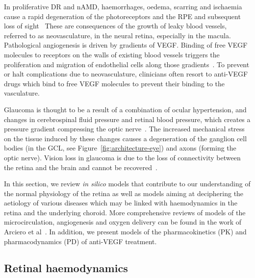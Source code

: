 \documentclass{article}
\begin{document}
In proliferative DR and nAMD, haemorrhages, oedema, scarring and ischaemia cause a rapid degeneration of the photoreceptors and the RPE and subsequent loss of sight~\cite{Gupta_2015,Jager_2008,Roberts_2020, Waldstein_2016}
These are consequences of the growth of leaky blood vessels, referred to as neovasculature, in the neural retina, especially in the macula.
Pathological angiogenesis is driven by gradients of VEGF.
Binding of free VEGF molecules to receptors on the walls of existing blood vessels triggers the proliferation and migration of endothelial cells along those gradients~\cite{Ferrara_2004}.
To prevent or halt complications due to neovasculature, clinicians often resort to anti-VEGF drugs which bind to free VEGF molecules to prevent their binding to the vasculature.

Glaucoma is thought to be a result of a combination of ocular hypertension, and changes in cerebrospinal fluid pressure and retinal blood pressure, which creates a pressure gradient compressing the optic nerve~\cite{Band_2009,Nickells_2012}.
The increased mechanical stress on the tissue induced by these changes causes a degeneration of the ganglion cell bodies (in the GCL, see Figure~\ref{fig:architecture-eye}) and axons (forming the optic nerve).
Vision loss in glaucoma is due to the loss of connectivity between the retina and the brain and cannot be recovered~\cite{Quigley_2011}.


In this section, we review \textit{in silico} models that contribute to our understanding of the normal physiology of the retina as well as models aiming at deciphering the aetiology of various diseases which may be linked with haemodynamics in the retina and the underlying choroid.
More comprehensive reviews of models of the microcirculation, angiogenesis and oxygen delivery can be found in the work of Arciero et al~\cite{Arciero_2019, Arciero_2017}.
In addition, we present models of the pharmacokinetics (PK) and pharmacodynamics (PD) of anti-VEGF treatment.


\subsection{Retinal haemodynamics} \label{subsec:RetinalHaemodynamics}
\end{document}
